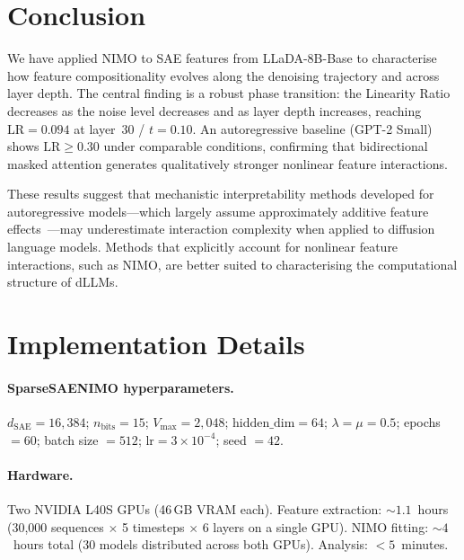 \documentclass{article}
\newcommand{\LR}{\mathrm{LR}}
\begin{document}
\section{Conclusion}

We have applied NIMO to SAE features from LLaDA-8B-Base to characterise how feature compositionality evolves along the denoising trajectory and across layer depth.
The central finding is a robust phase transition: the Linearity Ratio decreases as the noise level decreases and as layer depth increases, reaching $\LR = 0.094$ at layer~30 / $t = 0.10$.
An autoregressive baseline (GPT-2 Small) shows $\LR \ge 0.30$ under comparable conditions, confirming that bidirectional masked attention generates qualitatively stronger nonlinear feature interactions.

These results suggest that mechanistic interpretability methods developed for autoregressive models---which largely assume approximately additive feature effects~\citep{elhage2022toy}---may underestimate interaction complexity when applied to diffusion language models. Methods that explicitly account for nonlinear feature interactions, such as NIMO, are better suited to characterising the computational structure of dLLMs.




\appendix

\section{Implementation Details}
\label{app:impl}

\paragraph{SparseSAENIMO hyperparameters.}
$d_\mathrm{SAE} = 16{,}384$; $n_\mathrm{bits} = 15$; $V_\mathrm{max} = 2{,}048$; $\mathrm{hidden\_dim} = 64$; $\lambda = \mu = 0.5$; epochs $= 60$; batch size $= 512$; $\mathrm{lr} = 3\times10^{-4}$; seed $= 42$.

\paragraph{Hardware.}
Two NVIDIA L40S GPUs (46\,GB VRAM each).
Feature extraction: ${\sim}1.1$~hours (30,000 sequences $\times$ 5 timesteps $\times$ 6 layers on a single GPU).
NIMO fitting: ${\sim}4$~hours total (30 models distributed across both GPUs).
Analysis: ${<}5$~minutes.
\end{document}
